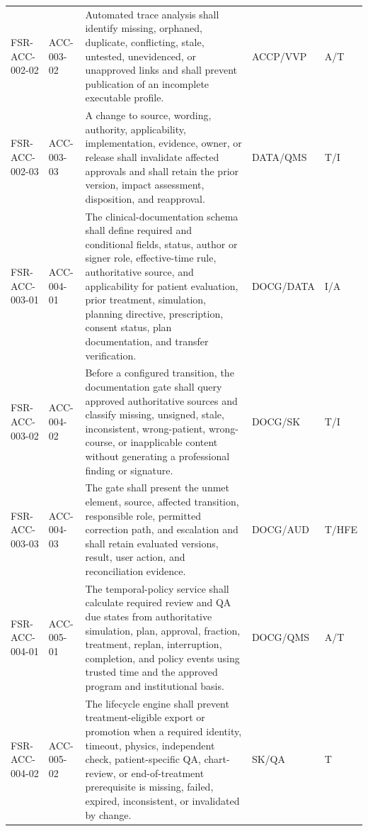 \documentclass[11pt,letterpaper]{article}
\begin{document}
\begin{scriptsize}
\begin{longtable}{@{}L{0.16\textwidth}L{0.12\textwidth}L{0.45\textwidth}L{0.15\textwidth}L{0.07\textwidth}@{}}
\addlinespace[2pt]
\mbox{FSR-ACC-002-02} & \mbox{ACC-003-02} & Automated trace analysis shall identify missing, orphaned, duplicate, conflicting, stale, untested, unevidenced, or unapproved links and shall prevent publication of an incomplete executable profile. & ACCP\slash\allowbreak{}VVP & A\slash\allowbreak{}T \\
\addlinespace[2pt]
\mbox{FSR-ACC-002-03} & \mbox{ACC-003-03} & A change to source, wording, authority, applicability, implementation, evidence, owner, or release shall invalidate affected approvals and shall retain the prior version, impact assessment, disposition, and reapproval. & DATA\slash\allowbreak{}QMS & T\slash\allowbreak{}I \\
\addlinespace[2pt]
\mbox{FSR-ACC-003-01} & \mbox{ACC-004-01} & The clinical-documentation schema shall define required and conditional fields, status, author or signer role, effective-time rule, authoritative source, and applicability for patient evaluation, prior treatment, simulation, planning directive, prescription, consent status, plan documentation, and transfer verification. & DOCG\slash\allowbreak{}DATA & I\slash\allowbreak{}A \\
\addlinespace[2pt]
\mbox{FSR-ACC-003-02} & \mbox{ACC-004-02} & Before a configured transition, the documentation gate shall query approved authoritative sources and classify missing, unsigned, stale, inconsistent, wrong-patient, wrong-course, or inapplicable content without generating a professional finding or signature. & DOCG\slash\allowbreak{}SK & T\slash\allowbreak{}I \\
\addlinespace[2pt]
\mbox{FSR-ACC-003-03} & \mbox{ACC-004-03} & The gate shall present the unmet element, source, affected transition, responsible role, permitted correction path, and escalation and shall retain evaluated versions, result, user action, and reconciliation evidence. & DOCG\slash\allowbreak{}AUD & T\slash\allowbreak{}HFE \\
\addlinespace[2pt]
\mbox{FSR-ACC-004-01} & \mbox{ACC-005-01} & The temporal-policy service shall calculate required review and QA due states from authoritative simulation, plan, approval, fraction, treatment, replan, interruption, completion, and policy events using trusted time and the approved program and institutional basis. & DOCG\slash\allowbreak{}QMS & A\slash\allowbreak{}T \\
\addlinespace[2pt]
\mbox{FSR-ACC-004-02} & \mbox{ACC-005-02} & The lifecycle engine shall prevent treatment-eligible export or promotion when a required identity, timeout, physics, independent check, patient-specific QA, chart-review, or end-of-treatment prerequisite is missing, failed, expired, inconsistent, or invalidated by change. & SK\slash\allowbreak{}QA & T \\

\end{longtable}
\end{scriptsize}
\end{document}

